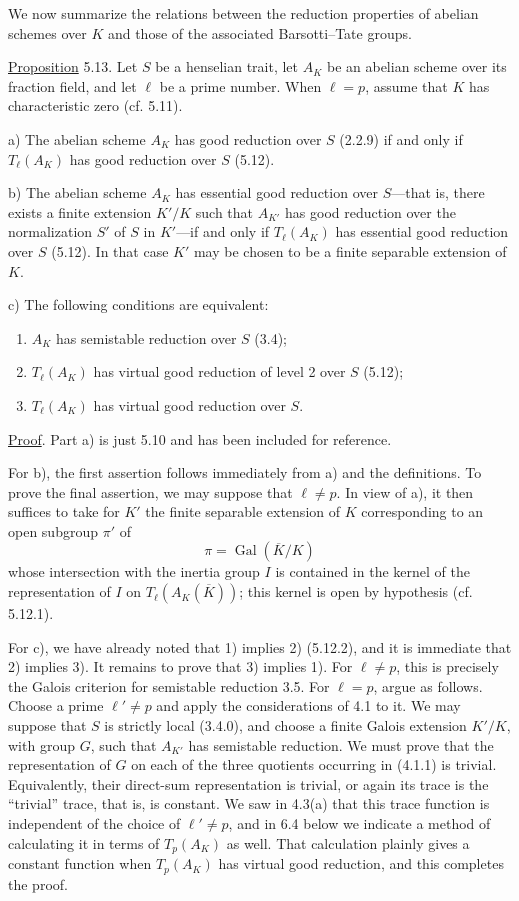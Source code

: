We now summarize the relations between the reduction properties of
abelian schemes over $K$ and those of the associated Barsotti--Tate
groups.

\medskip
\noindent
\underline{Proposition} 5.13. Let $S$ be a henselian trait, let $A_K$
be an abelian scheme over its fraction field, and let $\ell$ be a prime
number. When $\ell=p$, assume that $K$ has characteristic zero
(cf. 5.11).

\smallskip
\noindent
a) The abelian scheme $A_K$ has good reduction over $S$ (2.2.9) if and
only if $T_\ell(A_K)$ has good reduction over $S$ (5.12).

\smallskip
\noindent
b) The abelian scheme $A_K$ has essential good reduction over $S$---that
is, there exists a finite extension $K'/K$ such that $A_{K'}$ has good
reduction over the normalization $S'$ of $S$ in $K'$---if and only if
$T_\ell(A_K)$ has essential good reduction over $S$ (5.12). In that
case $K'$ may be chosen to be a finite separable extension of $K$.

\smallskip
\noindent
c) The following conditions are equivalent:
\begin{enumerate}
\item[1)] $A_K$ has semistable reduction over $S$ (3.4);
\item[2)] $T_\ell(A_K)$ has virtual good reduction of level 2 over $S$
  (5.12);
\item[3)] $T_\ell(A_K)$ has virtual good reduction over $S$.
\end{enumerate}

\noindent
\underline{Proof}. Part a) is just 5.10 and has been included for
reference.

For b), the first assertion follows immediately from a) and the
definitions. To prove the final assertion, we may suppose that
$\ell\neq p$. In view of a), it then suffices to take for $K'$ the
finite separable extension of $K$ corresponding to an open subgroup
$\pi'$ of
\[
 \pi=\operatorname{Gal}(\overline K/K)
\]
whose intersection with the inertia group $I$ is contained in the
kernel of the representation of $I$ on
$T_\ell(A_K(\overline K))$; this kernel is open by hypothesis
(cf. 5.12.1).

For c), we have already noted that 1) implies 2) (5.12.2), and it is
immediate that 2) implies 3). It remains to prove that 3) implies 1).
For $\ell\neq p$, this is precisely the Galois criterion for
semistable reduction 3.5. For $\ell=p$, argue as follows. Choose a
prime $\ell'\neq p$ and apply the considerations of 4.1 to it. We may
suppose that $S$ is strictly local (3.4.0), and choose a finite Galois
extension $K'/K$, with group $G$, such that $A_{K'}$ has semistable
reduction. We must prove that the representation of $G$ on each of the
three quotients occurring in (4.1.1) is trivial. Equivalently, their
direct-sum representation is trivial, or again its trace is the
``trivial'' trace, that is, is constant. We saw in 4.3(a) that this
trace function is independent of the choice of $\ell'\neq p$, and in
6.4 below we indicate a method of calculating it in terms of
$T_p(A_K)$ as well. That calculation plainly gives a constant function
when $T_p(A_K)$ has virtual good reduction, and this completes the
proof.

